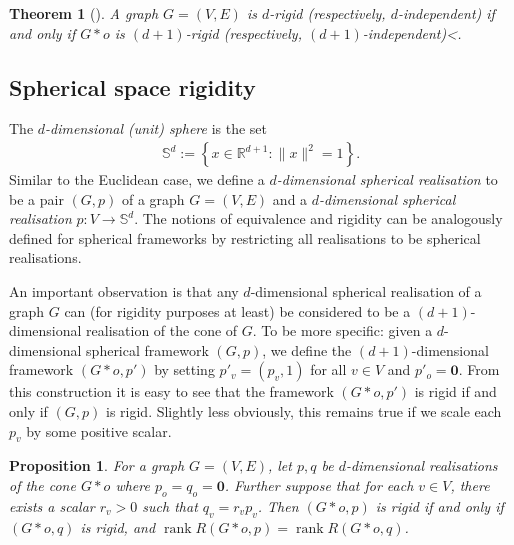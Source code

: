 \documentclass[11pt]{article}
\newtheorem{proposition}[theo]{Proposition}
\newtheorem{theorem}[theo]{Theorem}
\theoremstyle{definition}
\numberwithin{equation}{section}
\DeclareMathOperator{\rank}{rank}
\begin{document}
\begin{theorem}[{\cite[Theorem 5]{coning}}]\label{t:cone}
	A graph $G=(V,E)$ is $d$-rigid \textup{(}respectively, $d$-independent\textup{)} if and only if $G*o$ is $(d+1)$-rigid \textup{(}respectively, $(d+1)$-independent\textup{)}<.
\end{theorem}
 




\subsection{Spherical space rigidity}

The \emph{$d$-dimensional (unit) sphere} is the set
\begin{align*}
	\mathbb{S}^d := \left\{ x \in \mathbb{R}^{d+1} : \|x\|^2=1 \right\}.
\end{align*}
Similar to the Euclidean case, we define a \emph{$d$-dimensional spherical realisation} to be a pair $(G,p)$ of a graph $G=(V,E)$ and a \emph{$d$-dimensional spherical realisation} \mbox{$p: V \rightarrow \mathbb{S}^d$}.
The notions of equivalence and rigidity can be analogously defined for spherical frameworks by restricting all realisations to be spherical realisations.

An important observation is that any $d$-dimensional spherical realisation of a graph $G$ can (for rigidity purposes at least) be considered to be a $(d+1)$-dimensional realisation of the cone of $G$.
To be more specific:
given a $d$-dimensional spherical framework $(G,p)$,
we define the $(d+1)$-dimensional framework $(G*o,p')$ by setting $p'_v=(p_v,1)$ for all $v \in V$ and $p'_o = \mathbf{0}$.
From this construction it is easy to see that the framework $(G*o,p')$ is rigid if and only if $(G,p)$ is rigid.
Slightly less obviously,
this remains true if we scale each $p_v$ by some positive scalar.

\begin{proposition}\label{p:slide}
	For a graph $G=(V,E)$,
	let $p,q$ be $d$-dimensional realisations of the cone $G*o$ where $p_o=q_o = \mathbf{0}$.
	Further suppose that for each $v \in V$,
	there exists a scalar $r_v >0$ such that $q_v = r_v p_v$.
	Then $(G*o,p)$ is rigid if and only if $(G*o,q)$ is rigid,
	and $\rank R(G*o,p) = \rank R(G*o,q)$.
\end{proposition}
\end{document}
